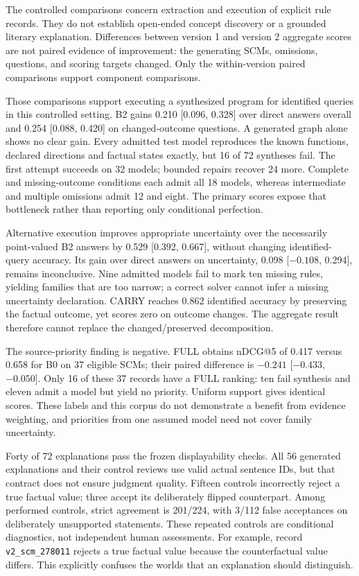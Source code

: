 The controlled comparisons concern extraction and execution of explicit rule records. They do not establish open-ended concept discovery or a grounded literary explanation. Differences between version 1 and version 2 aggregate scores are not paired evidence of improvement: the generating SCMs, omissions, questions, and scoring targets changed. Only the within-version paired comparisons support component comparisons.

Those comparisons support executing a synthesized program for identified queries in this controlled setting. B2 gains 0.210 [0.096, 0.328] over direct answers overall and 0.254 [0.088, 0.420] on changed-outcome questions. A generated graph alone shows no clear gain. Every admitted test model reproduces the known functions, declared directions and factual states exactly, but 16 of 72 syntheses fail. The first attempt succeeds on 32 models; bounded repairs recover 24 more. Complete and missing-outcome conditions each admit all 18 models, whereas intermediate and multiple omissions admit 12 and eight. The primary scores expose that bottleneck rather than reporting only conditional perfection.

Alternative execution improves appropriate uncertainty over the necessarily point-valued B2 answers by 0.529 [0.392, 0.667], without changing identified-query accuracy. Its gain over direct answers on uncertainty, 0.098 [$-0.108$, 0.294], remains inconclusive. Nine admitted models fail to mark ten missing rules, yielding families that are too narrow; a correct solver cannot infer a missing uncertainty declaration. CARRY reaches 0.862 identified accuracy by preserving the factual outcome, yet scores zero on outcome changes. The aggregate result therefore cannot replace the changed/preserved decomposition.

The source-priority finding is negative. FULL obtains nDCG@5 of 0.417 versus 0.658 for B0 on 37 eligible SCMs; their paired difference is $-0.241$ [$-0.433$, $-0.050$]. Only 16 of these 37 records have a FULL ranking: ten fail synthesis and eleven admit a model but yield no priority. Uniform support gives identical scores. These labels and this corpus do not demonstrate a benefit from evidence weighting, and priorities from one assumed model need not cover family uncertainty.

Forty of 72 explanations pass the frozen displayability checks. All 56 generated explanations and their control reviews use valid actual sentence IDs, but that contract does not ensure judgment quality. Fifteen controls incorrectly reject a true factual value; three accept its deliberately flipped counterpart. Among performed controls, strict agreement is 201/224, with 3/112 false acceptances on deliberately unsupported statements. These repeated controls are conditional diagnostics, not independent human assessments. For example, record \texttt{v2\_scm\_278011} rejects a true factual value because the counterfactual value differs. This explicitly confuses the worlds that an explanation should distinguish.

